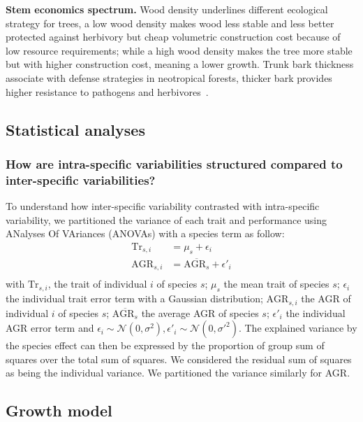 \textbf{Stem economics spectrum.} Wood density underlines different ecological strategy for trees, a low wood density makes wood less stable and less better protected against herbivory but cheap volumetric construction cost because of low resource requirements; while a high wood density makes the tree more stable but with higher construction cost, meaning a lower growth. Trunk bark thickness associate with defense strategies in neotropical forests, thicker bark provides higher resistance to pathogens and herbivores~\citep{paine_functional_2010}.

\subsection*{Statistical analyses}

\subsubsection*{How are intra-specific variabilities structured compared to inter-specific variabilities?}

To understand how inter-specific variability contrasted with intra-specific variability, we partitioned the variance of each trait and performance using ANalyses Of VAriances (ANOVAs) with a species term as follow:
\begin{equation}
	\label{eq:anova}
	\begin{aligned}
	\text{Tr}_{s, i} &= \mu_s + \epsilon_i\\
	\text{AGR}_{s, i} &= \overline{\text{AGR}_{s}} + \epsilon'_i\\
	\end{aligned}
\end{equation}
with $\text{Tr}_{s, i}$, the trait of individual $i$ of species $s$; $\mu_s$ the mean trait of species $s$; $\epsilon_i$ the individual trait error term with a Gaussian distribution; $\text{AGR}_{s, i}$ the AGR of individual $i$ of species $s$; $\overline{\text{AGR}_{s}}$ the average AGR of species $s$; $\epsilon'_i$ the individual AGR error term and $\epsilon_i \sim \mathcal{N}(0, \sigma^2), \epsilon'_i \sim \mathcal{N}(0, \sigma'^2)$. The explained variance by the species effect can then be expressed by the proportion of group sum of squares over the total sum of squares. We considered the residual sum of squares as being the individual variance. We partitioned the variance similarly for AGR.

\subsection*{Growth model}

